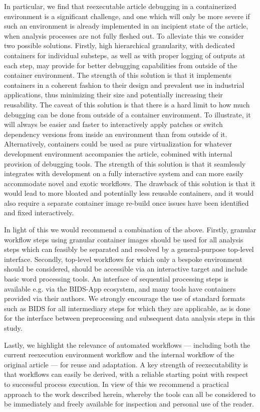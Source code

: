 In particular, we find that reexecutable article debugging in a containerized environment is a significant challenge, and one which will only be more severe if such an environment is already implemented in an incipient state of the article, when analysis processes are not fully fleshed out.
To alleviate this we consider two possible solutions.
Firstly, high hierarchical granularity, with dedicated containers for individual substeps, as well as with proper logging of outputs at each step, may provide for better debugging capabilities from outside of the container environment.
The strength of this solution is that it implements containers in a coherent fashion to their design and prevalent use in industrial applications, thus minimizing their size and potentially increasing their reusability.
The caveat of this solution is that there is a hard limit to how much debugging can be done from outside of a container environment.
To illustrate, it will always be easier and faster to interactively apply patches or switch dependency versions from inside an environment than from outside of it.
Alternatively, containers could be used as pure virtualization for whatever development environment accompanies the article, cobmined with internal provision of debugging tools.
The strength of this solution is that it seamlessly integrates with development on a fully interactive system and can more easily accommodate novel and exotic workflows.
The drawback of this solution is that it would lead to more bloated and potentially less reusable containers, and it would also require a separate container image re-build once issues have been identified and fixed interactively.

In light of this we would recommend a combination of the above.
Firstly, granular workflow steps using granular container images should be used for all analysis steps which can feasibly be separated and resolved by a general-purpose top-level interface.
Secondly, top-level workflows for which only a bespoke environment should be considered, should be accessible via an interactive target and include basic word processing tools.
An interface of sequential processing steps is available e.g. via the BIDS-App ecosystem, and many tools have containers provided via their authors.
We strongly encourage the use of standard formats such as BIDS for all intermediary steps for which they are applicable, as is done for the interface between preprocessing and subsequent data analysis steps in this study.

Lastly, we highlight the relevance of automated workflows — including both the current reexecution environment workflow and the internal workflow of the original article — for reuse and adaptation.
A key strength of reexecutability is that workflows can easily be derived, with a reliable starting point with respect to successful process execution.
In view of this we recommend a practical approach to the work described herein, whereby the tools can all be considered to be immediately and freely available for inspection and personal use of the reader.

